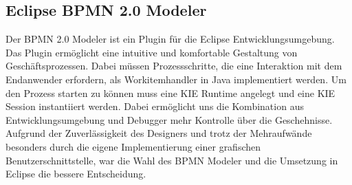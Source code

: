 \subsection{Eclipse BPMN 2.0 Modeler}
Der BPMN 2.0 Modeler ist ein Plugin für die Eclipse Entwicklungsumgebung. Das Plugin ermöglicht eine intuitive und komfortable Gestaltung von Geschäftsprozessen. Dabei müssen Prozessschritte, die eine Interaktion mit dem Endanwender erfordern, als Workitemhandler in Java implementiert werden. Um den Prozess starten zu können muss eine KIE Runtime angelegt und eine KIE Session instantiiert werden. Dabei ermöglicht uns die Kombination aus Entwicklungsumgebung und Debugger mehr Kontrolle über die Geschehnisse. Aufgrund der Zuverlässigkeit des Designers und trotz der Mehraufwände besonders durch die eigene Implementierung einer grafischen Benutzerschnittstelle, war die Wahl des BPMN Modeler und die Umsetzung in Eclipse die bessere Entscheidung. 